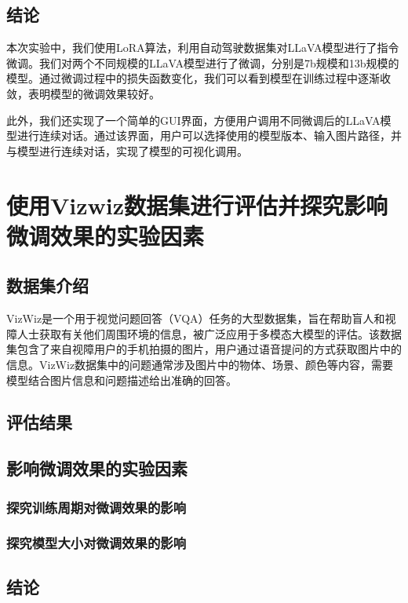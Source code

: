 \documentclass[
    linespread = 1.25
]{ctexart}
\begin{document}
\subsection{结论}

本次实验中，我们使用LoRA算法，利用自动驾驶数据集对LLaVA模型进行了指令微调。我们对两个不同规模的LLaVA模型进行了微调，分别是7b规模和13b规模的模型。通过微调过程中的损失函数变化，我们可以看到模型在训练过程中逐渐收敛，表明模型的微调效果较好。

此外，我们还实现了一个简单的GUI界面，方便用户调用不同微调后的LLaVA模型进行连续对话。通过该界面，用户可以选择使用的模型版本、输入图片路径，并与模型进行连续对话，实现了模型的可视化调用。

\section{使用Vizwiz数据集进行评估并探究影响微调效果的实验因素}

\subsection{数据集介绍}

VizWiz是一个用于视觉问题回答（VQA）任务的大型数据集，旨在帮助盲人和视障人士获取有关他们周围环境的信息，被广泛应用于多模态大模型的评估。该数据集包含了来自视障用户的手机拍摄的图片，用户通过语音提问的方式获取图片中的信息。VizWiz数据集中的问题通常涉及图片中的物体、场景、颜色等内容，需要模型结合图片信息和问题描述给出准确的回答。

\subsection{评估结果}

\subsection{影响微调效果的实验因素}

\subsubsection{探究训练周期对微调效果的影响}

\subsubsection{探究模型大小对微调效果的影响}

\subsection{结论}
\end{document}

